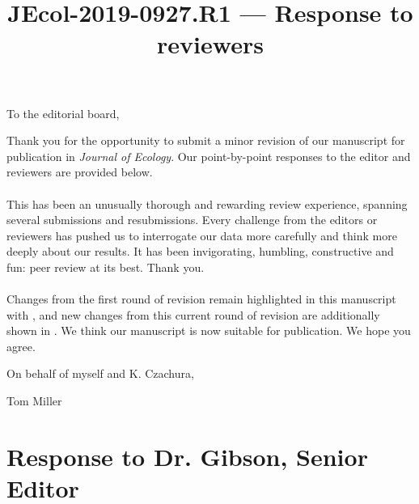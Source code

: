 \documentclass[12pt]{article}
\newcommand{\revise}[1]{{\color{Mahogany}{#1}}}
\newcommand{\reviseagain}[1]{{\color{RoyalBlue}{#1}}}
\begin{document}
\title{JEcol-2019-0927.R1 --- Response to reviewers}

\maketitle
\noindent To the editorial board,

Thank you for the opportunity to submit a minor revision of our manuscript for publication in \textit{Journal of Ecology}. 
Our point-by-point responses to the editor and reviewers are provided below. 
\\
\\
This has been an unusually thorough and rewarding review experience, spanning several submissions and resubmissions. 
Every challenge from the editors or reviewers has pushed us to interrogate our data more carefully and think more deeply about our results. 
It has been invigorating, humbling, constructive and fun: peer review at its best.
Thank you.
\\
\\
Changes from the first round of revision remain highlighted in this manuscript with \revise{Mahogany font}, and new changes from this current round of revision are additionally shown in \reviseagain{Royal Blue}.
We think our manuscript is now suitable for publication.
We hope you agree. 

\vspace{2em}
\hfill On behalf of myself and K. Czachura,

\hfill Tom Miller
\newpage



\section{Response to Dr. Gibson, Senior Editor}
\vspace{-2em}
\end{document}
